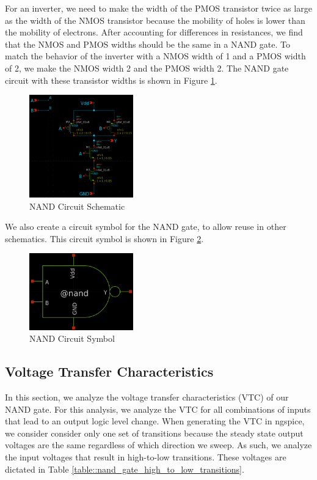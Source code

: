 \documentclass{article}
\begin{document}
	For an inverter, we need to make the width of the PMOS transistor twice as large as the width of the NMOS transistor because the mobility of holes is lower than the mobility of electrons. After accounting for differences in resistances, we find that the NMOS and PMOS widths should be the same in a NAND gate. To match the behavior of the inverter with a NMOS width of 1 and a PMOS width of 2, we make the NMOS width 2 and the PMOS width 2. The NAND gate circuit with these transistor widths is shown in Figure \ref{fig::nand_schematic}.
	
	\begin{figure}[H]
		\centerline{\includegraphics[width=0.4\textwidth]{nand_schematic.png}}
		\caption{NAND Circuit Schematic}
		\label{fig::nand_schematic}
	\end{figure}

	\noindent We also create a circuit symbol for the NAND gate, to allow reuse in other schematics. This circuit symbol is shown in Figure \ref{fig::nand_symbol}.
	
	\begin{figure}[H]
		\centerline{\includegraphics[width=0.4\textwidth]{nand_symbol.png}}
		\caption{NAND Circuit Symbol}
		\label{fig::nand_symbol}
	\end{figure}
	
	\subsection{Voltage Transfer Characteristics}
	
	In this section, we analyze the voltage transfer characteristics (VTC) of our NAND gate. For this analysis, we analyze the VTC for all combinations of inputs that lead to an output logic level change. When generating the VTC in ngspice, we consider consider only one set of transitions because the steady state output voltages are the same regardless of which direction we sweep. As such, we analyze the input voltages that result in high-to-low transitions. These voltages are dictated in Table \ref{table::nand_gate_high_to_low_transitions}.
	
\end{document}
